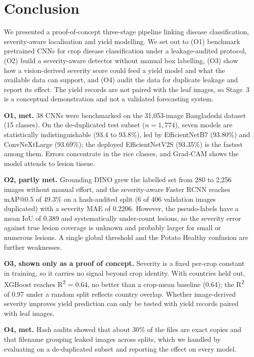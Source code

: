 \section{Conclusion}
\label{sec:conclusion}

We presented a proof-of-concept three-stage pipeline linking disease classification, severity-aware localisation and yield modelling. We set out to (O1) benchmark pretrained CNNs for crop disease classification under a leakage-audited protocol, (O2) build a severity-aware detector without manual box labelling, (O3) show how a vision-derived severity score could feed a yield model and what the available data can support, and (O4) audit the data for duplicate leakage and report its effect. The yield records are not paired with the leaf images, so Stage~3 is a conceptual demonstration and not a validated forecasting system.

\textbf{O1, met.} 38 CNNs were benchmarked on the 31,053-image Bangladeshi dataset (15 classes). On the de-duplicated test subset ($n=1{,}774$), seven models are statistically indistinguishable (93.4 to 93.8\%), led by EfficientNetB7 (93.80\%) and ConvNeXtLarge (93.69\%); the deployed EfficientNetV2S (93.35\%) is the fastest among them. Errors concentrate in the rice classes, and Grad-CAM shows the model attends to lesion tissue.

\textbf{O2, partly met.} Grounding DINO grew the labelled set from 280 to 2,256 images without manual effort, and the severity-aware Faster RCNN reaches mAP@0.5 of 49.3\% on a hash-audited split (6 of 406 validation images duplicated) with a severity MAE of 0.2206. However, the pseudo-labels have a mean IoU of 0.389 and systematically under-count lesions, so the severity error against true lesion coverage is unknown and probably larger for small or numerous lesions. A single global threshold and the Potato Healthy confusion are further weaknesses.

\textbf{O3, shown only as a proof of concept.} Severity is a fixed per-crop constant in training, so it carries no signal beyond crop identity. With countries held out, XGBoost reaches R\textsuperscript{2} = 0.64, no better than a crop-mean baseline (0.64); the R\textsuperscript{2} of 0.97 under a random split reflects country overlap. Whether image-derived severity improves yield prediction can only be tested with yield records paired with leaf images.

\textbf{O4, met.} Hash audits showed that about 30\% of the files are exact copies and that filename grouping leaked images across splits, which we handled by evaluating on a de-duplicated subset and reporting the effect on every model.

